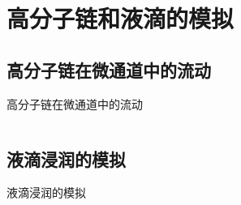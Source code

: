 \section{高分子链和液滴的模拟}
\subsection{高分子链在微通道中的流动}
\begin{frame}{高分子链在微通道中的流动}
\begin{columns}
\begin{column}[c]{0.5\textwidth}
\begin{center}

\end{center}
\end{column}
\begin{column}[c]{0.5\textwidth}
\begin{center}

\end{center}
\end{column}
\end{columns}
\end{frame}
\subsection{液滴浸润的模拟}
\begin{frame}{液滴浸润的模拟}
\begin{center}

\end{center}
\end{frame}
